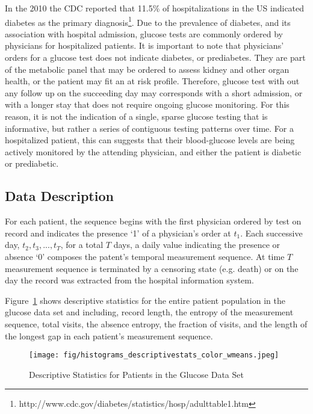 In the 2010 the CDC reported that 11.5\% of hospitalizations in the US indicated diabetes as the primary diagnosis\footnote{http://www.cdc.gov/diabetes/statistics/hosp/adulttable1.htm}.  Due to the prevalence of diabetes, and its association with hospital admission, glucose tests are commonly ordered by physicians for hospitalized patients.  It is important to note that physicians' orders for a glucose test does not indicate diabetes, or prediabetes.  They are part of the metabolic panel that may be ordered to assess kidney and other organ health, or the patient may fit an at risk profile.  Therefore, glucose test with out any follow up on the succeeding day may corresponds with a short admission, or with a longer stay that does not require ongoing glucose monitoring. For this reason, it is not the indication of a single, sparse glucose testing that is informative, but rather a series of contiguous testing patterns over time.  For a hospitalized patient, this can suggests that their blood-glucose levels are being actively monitored by the attending physician, and either the patient is diabetic or prediabetic.

\subsection{Data Description}
For each patient, the sequence begins with the first physician ordered by test on record and indicates the presence `1' of a physician's order at $t_1$.  Each successive day, $t_2,t_3,...,t_T$, for a total $T$ days, a daily value indicating the presence or absence `0'  composes the patent's temporal measurement sequence.  At time $T$ measurement sequence is terminated by a censoring state (e.g. death) or on the day the record was extracted from the hospital information system.

Figure~\ref{desc_glucose} shows descriptive statistics for the entire patient population in the glucose data set and including, record length, the entropy of the measurement sequence, total visits, the absence entropy, the fraction of visits, and the length of the longest gap in each patient's measurement sequence.

\begin{figure}[ht]
  \centering
  \texttt{[image: fig/histograms\_descriptivestats\_color\_wmeans.jpeg]}\\
  \caption{Descriptive Statistics for Patients in the Glucose Data Set}\label{desc_glucose}
\end{figure}

